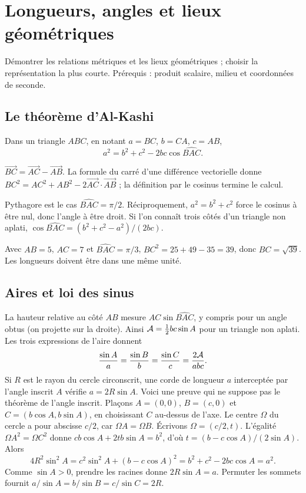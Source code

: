 \documentclass[../cours_1re.tex]{subfiles}
\begin{document}
\setcounter{chapter}{16}
\chapter{Longueurs, angles et lieux géométriques}
\label{ch:17}
\begin{objectif}
Démontrer les relations métriques et les lieux géométriques ; choisir la représentation la plus courte.
Prérequis : produit scalaire, milieu et coordonnées de seconde.
\end{objectif}
\section{Le théorème d'Al-Kashi}
\begin{theoreme}
Dans un triangle $ABC$, en notant $a=BC$, $b=CA$, $c=AB$,
\[
a^2=b^2+c^2-2bc\cos\widehat{BAC}.
\]
\end{theoreme}
\begin{demonstration}
$\overrightarrow{BC}=\overrightarrow{AC}-\overrightarrow{AB}$.
La formule du carré d'une différence vectorielle donne
$BC^2=AC^2+AB^2-2\overrightarrow{AC}\cdot\overrightarrow{AB}$ ;
la définition par le cosinus termine le calcul.
\end{demonstration}
Pythagore est le cas $\widehat{BAC}=\pi/2$. Réciproquement,
$a^2=b^2+c^2$ force le cosinus à être nul, donc l'angle à être droit.
Si l'on connaît trois côtés d'un triangle non aplati,
$\cos\widehat{BAC}=(b^2+c^2-a^2)/(2bc)$.

\begin{exemple}
Avec $AB=5$, $AC=7$ et $\widehat{BAC}=\pi/3$,
$BC^2=25+49-35=39$, donc $BC=\sqrt{39}$.
Les longueurs doivent être dans une même unité.
\end{exemple}

\section{Aires et loi des sinus}
La hauteur relative au côté $AB$ mesure $AC\sin\widehat{BAC}$,
y compris pour un angle obtus (on projette sur la droite).
Ainsi $\mathcal{A}=\frac12bc\sin A$ pour un triangle non aplati.
Les trois expressions de l'aire donnent
\[
\frac{\sin A}{a}=\frac{\sin B}{b}=\frac{\sin C}{c}
=\frac{2\mathcal{A}}{abc}.
\]
\approfondissement
Si $R$ est le rayon du cercle circonscrit, une corde de longueur $a$
interceptée par l'angle inscrit $A$ vérifie $a=2R\sin A$.
Voici une preuve qui ne suppose pas le théorème de l'angle inscrit.
Plaçons $A=(0,0)$, $B=(c,0)$ et $C=(b\cos A,b\sin A)$,
en choisissant $C$ au-dessus de l'axe. Le centre $\Omega$ du cercle a
pour abscisse $c/2$, car $\Omega A=\Omega B$. Écrivons $\Omega=(c/2,t)$.
L'égalité $\Omega A^2=\Omega C^2$ donne
$cb\cos A+2tb\sin A=b^2$, d'où
$t=(b-c\cos A)/(2\sin A)$. Alors
\[
4R^2\sin^2 A
=c^2\sin^2 A+(b-c\cos A)^2
=b^2+c^2-2bc\cos A=a^2.
\]
Comme $\sin A>0$, prendre les racines donne $2R\sin A=a$.
Permuter les sommets fournit $a/\sin A=b/\sin B=c/\sin C=2R$.
\end{document}
